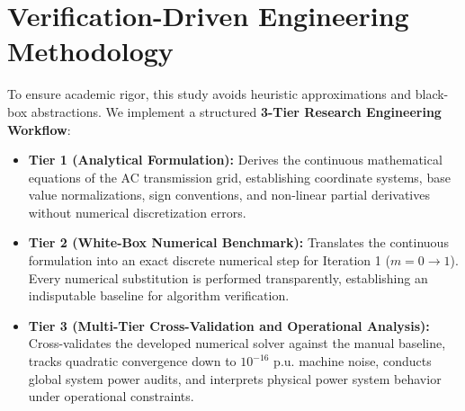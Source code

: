 \documentclass[12pt,a4paper,oneside]{report}
\begin{document}
\section{Verification-Driven Engineering Methodology}
To ensure academic rigor, this study avoids heuristic approximations and black-box abstractions. We implement a structured \textbf{3-Tier Research Engineering Workflow}:
\begin{itemize}
    \item \textbf{Tier 1 (Analytical Formulation):} Derives the continuous mathematical equations of the AC transmission grid, establishing coordinate systems, base value normalizations, sign conventions, and non-linear partial derivatives without numerical discretization errors.
    \item \textbf{Tier 2 (White-Box Numerical Benchmark):} Translates the continuous formulation into an exact discrete numerical step for Iteration 1 ($m = 0 \to 1$). Every numerical substitution is performed transparently, establishing an indisputable baseline for algorithm verification.
    \item \textbf{Tier 3 (Multi-Tier Cross-Validation and Operational Analysis):} Cross-validates the developed numerical solver against the manual baseline, tracks quadratic convergence down to $10^{-16}\text{ p.u.}$ machine noise, conducts global system power audits, and interprets physical power system behavior under operational constraints.
\end{itemize}
\end{document}

